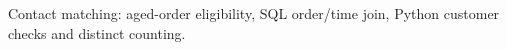 Contact matching: aged-order eligibility, SQL order/time join, Python customer checks and distinct counting.
